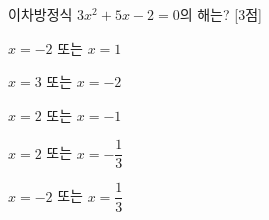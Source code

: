 이차방정식 $3x^2+5x-2=0$의 해는? \mbox{[3점]}
\begin{choicesii}{\rule[-3ex]{0pt}{8ex}$x=-2$ 또는 $x=1$}{\rule[-3ex]{0pt}{8ex}$x=3$ 또는 $x=-2$}{\rule[-3ex]{0pt}{8ex}$x=2$ 또는 $x=-1$}{\rule[-3ex]{0pt}{8ex}$x=2$ 또는 $x=-\dfrac{1}{3}$}{\rule[-3ex]{0pt}{8ex}$x=-2$ 또는 $x=\dfrac{1}{3}$}\end{choicesii}
